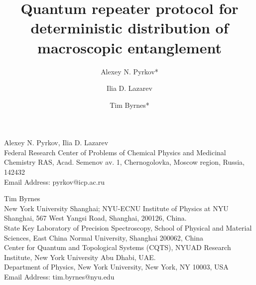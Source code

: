 \documentclass{WileyMSP-template}
\begin{document}
\pagestyle{fancy}


\title{Quantum repeater protocol for deterministic distribution of macroscopic entanglement}

\maketitle

\author{Alexey N. Pyrkov*}
\author{Ilia D. Lazarev}
\author{Tim Byrnes*}

\begin{affiliations}
Alexey N. Pyrkov, Ilia D. Lazarev\\
Federal Research Center of Problems of Chemical Physics and Medicinal Chemistry RAS, Acad. Semenov av. 1, Chernogolovka, Moscow region, Russia, 142432\\
Email Address: pyrkov@icp.ac.ru

Tim Byrnes\\
New York University Shanghai; NYU-ECNU Institute of Physics at NYU Shanghai, 567 West Yangsi Road, Shanghai, 200126, China.\\
State Key Laboratory of Precision Spectroscopy, School of Physical and Material Sciences, East China Normal University, Shanghai 200062, China\\
Center for Quantum and Topological Systems (CQTS), NYUAD Research Institute, New York University Abu Dhabi, UAE.\\
Department of Physics, New York University, New York, NY 10003, USA\\
Email Address: tim.byrnes@nyu.edu
\end{affiliations}

\end{document}
